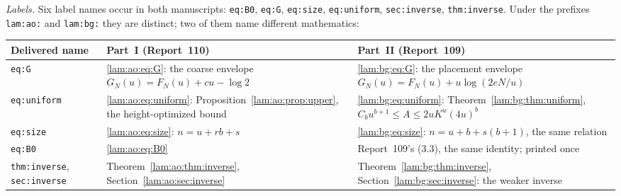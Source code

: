 \documentclass[11pt,a4paper]{article}
\numberwithin{equation}{section}
\theoremstyle{remark}
\begin{document}
\emph{Labels.} Six label names occur in both manuscripts: \texttt{eq:B0}, \texttt{eq:G}, \texttt{eq:size}, \texttt{eq:uniform}, \texttt{sec:inverse}, \texttt{thm:inverse}. Under the prefixes \texttt{lam:ao:} and \texttt{lam:bg:} they are distinct; two of them name different mathematics:
\begin{center}
\small
\begin{tabular}{@{}>{\raggedright\arraybackslash}p{} >{\raggedright\arraybackslash}p{} >{\raggedright\arraybackslash}p{}@{}}
\toprule
Delivered name & Part~I (Report~110) & Part~II (Report~109)\\
\midrule
\texttt{eq:G} & \eqref{lam:ao:eq:G}: the coarse envelope $G_N(u)=F_N(u)+cu-\log2$ & \eqref{lam:bg:eq:G}: the placement envelope $G_N(u)=F_N(u)+u\log(2eN/u)$\\
\texttt{eq:uniform} & \eqref{lam:ao:eq:uniform}: Proposition~\ref{lam:ao:prop:upper}, the height-optimized bound & \eqref{lam:bg:eq:uniform}: Theorem~\ref{lam:bg:thm:uniform}, $C_bu^{b+1}\le A\le2uK^u(4u)^b$\\
\texttt{eq:size} & \eqref{lam:ao:eq:size}: $n=u+rb+s$ & \eqref{lam:bg:eq:size}: $n=u+b+s(b+1)$, the same relation\\
\texttt{eq:B0} & \eqref{lam:ao:eq:B0} & Report~109's (3.3), the same identity; printed once\\
\texttt{thm:inverse}, \texttt{sec:inverse} & Theorem~\ref{lam:ao:thm:inverse}, Section~\ref{lam:ao:sec:inverse} & Theorem~\ref{lam:bg:thm:inverse}, Section~\ref{lam:bg:sec:inverse}: the weaker inverse\\
\bottomrule
\end{tabular}
\end{center}
\end{document}
